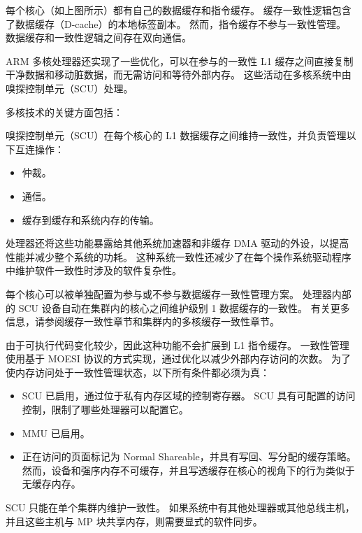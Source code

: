 
每个核心（如上图所示）都有自己的数据缓存和指令缓存。
缓存一致性逻辑包含了数据缓存（D-cache）的本地标签副本。
然而，指令缓存不参与一致性管理。
数据缓存和一致性逻辑之间存在双向通信。

ARM 多核处理器还实现了一些优化，可以在参与的一致性 L1 缓存之间直接复制干净数据和移动脏数据，而无需访问和等待外部内存。
这些活动在多核系统中由嗅探控制单元（SCU）处理。

多核技术的关键方面包括：


嗅探控制单元（SCU）在每个核心的 L1 数据缓存之间维持一致性，并负责管理以下互连操作：

\begin{itemize}
\item
  仲裁。
\item
  通信。
\item
  缓存到缓存和系统内存的传输。
\end{itemize}

处理器还将这些功能暴露给其他系统加速器和非缓存 DMA 驱动的外设，以提高性能并减少整个系统的功耗。
这种系统一致性还减少了在每个操作系统驱动程序中维护软件一致性时涉及的软件复杂性。

每个核心可以被单独配置为参与或不参与数据缓存一致性管理方案。
处理器内部的 SCU 设备自动在集群内的核心之间维护级别 1 数据缓存的一致性。
有关更多信息，请参阅缓存一致性章节和集群内的多核缓存一致性章节。

由于可执行代码变化较少，因此这种功能不会扩展到 L1 指令缓存。
一致性管理使用基于 MOESI 协议的方式实现，通过优化以减少外部内存访问的次数。
为了使内存访问处于一致性管理状态，以下所有条件都必须为真：

\begin{itemize}
\item
  SCU 已启用，通过位于私有内存区域的控制寄存器。
  SCU 具有可配置的访问控制，限制了哪些处理器可以配置它。
\item
  MMU 已启用。
\item
  正在访问的页面标记为 Normal
  Shareable，并具有写回、写分配的缓存策略。
  然而，设备和强序内存不可缓存，并且写透缓存在核心的视角下的行为类似于无缓存内存。
\end{itemize}


SCU 只能在单个集群内维护一致性。
如果系统中有其他处理器或其他总线主机，并且这些主机与 MP 块共享内存，则需要显式的软件同步。


